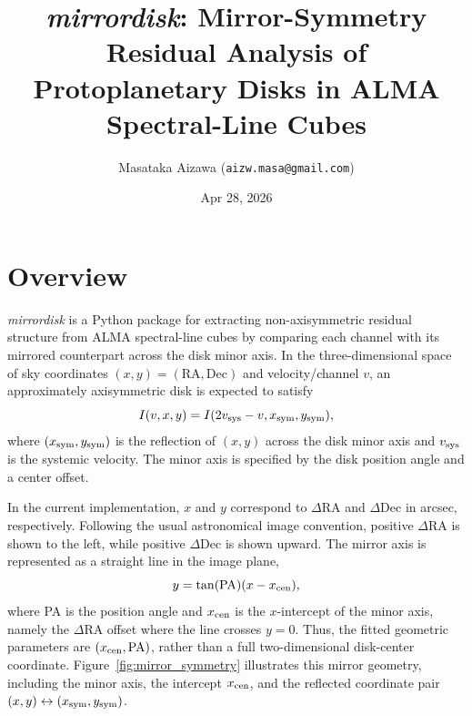 \documentclass{report}
\title{{\it mirrordisk}:  Mirror-Symmetry Residual Analysis of Protoplanetary Disks in ALMA Spectral-Line Cubes}
\author{Masataka Aizawa (\texttt{aizw.masa@gmail.com})}
\date{Apr 28, 2026}
\begin{document}
\maketitle

\tableofcontents

\chapter{Overview}
{\it mirrordisk} is a Python package for extracting non-axisymmetric residual structure from ALMA spectral-line cubes by comparing each channel with its mirrored counterpart across the disk minor axis. In the three-dimensional space of sky coordinates $(x, y) = (\mathrm{RA}, \mathrm{Dec})$ and velocity/channel $v$, an approximately axisymmetric disk is expected to satisfy
\begin{equation}
   I(v, x, y) = I(2v_{\rm sys} - v, x_{\rm sym}, y_{\rm sym}),
\end{equation}
where $(x_{\rm sym}, y_{\rm sym})$ is the reflection of $(x, y)$ across the disk minor axis and $v_{\rm sys}$ is the systemic velocity. The minor axis is specified by the disk position angle and a center offset.

In the current implementation, $x$ and $y$ correspond to $\Delta$RA and $\Delta$Dec in arcsec, respectively. Following the usual astronomical image convention, positive $\Delta$RA is shown to the left, while positive $\Delta$Dec is shown upward. The mirror axis is represented as a straight line in the image plane,
\begin{equation}
    y = \tan(\mathrm{PA}) (x - x_{\rm cen}),
\end{equation}
where PA is the position angle and $x_{\rm cen}$ is the $x$-intercept of the minor axis, namely the $\Delta$RA offset where the line crosses $y=0$. Thus, the fitted geometric parameters are $(x_{\rm cen}, \mathrm{PA})$, rather than a full two-dimensional disk-center coordinate.
Figure~\ref{fig:mirror_symmetry} illustrates this mirror geometry, including the minor axis, the intercept $x_{\rm cen}$, and the reflected coordinate pair $(x, y) \leftrightarrow (x_{\rm sym}, y_{\rm sym})$.
\end{document}
